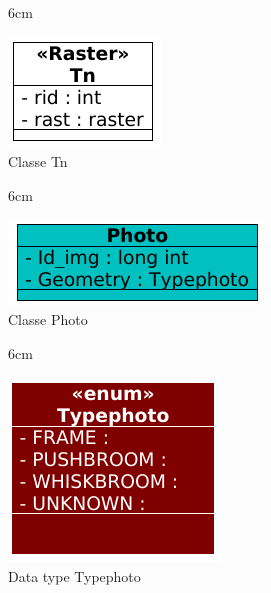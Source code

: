 \begin{figure}[!ht]{6cm}
  \caption{Classe Tn} \label{tn}
  \centering
  \includegraphics[width=0.55\hsize]{figuras/18.png}
\end{figure}

\begin{figure}[!ht]{6cm}
  \caption{Classe Photo} \label{photo}
  \centering
  \includegraphics[width=0.8\hsize]{figuras/3.png}
\end{figure}

\begin{figure}[!ht]{6cm}
  \caption{Data type Typephoto} \label{tp}
  \centering
  \includegraphics[width=0.8\hsize]{figuras/26.png}
\end{figure}

